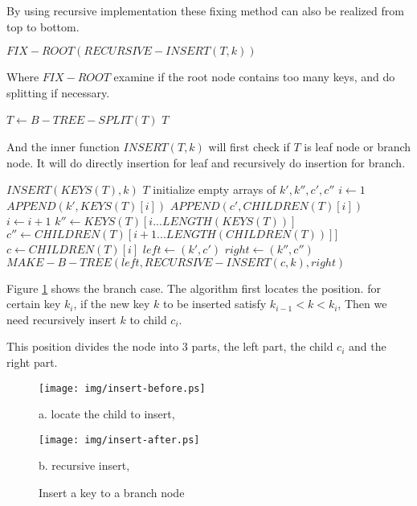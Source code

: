 \documentclass{article}
\begin{document}
By using recursive implementation these fixing method can also be
realized from top to bottom.

\begin{algorithmic}[1]
  \State \Return $FIX-ROOT(RECURSIVE-INSERT(T, k))$
\EndFunction
\end{algorithmic}

Where $FIX-ROOT$ examine if the root node contains too many keys,
and do splitting if necessary.

\begin{algorithmic}[1]
    \State $T \leftarrow B-TREE-SPLIT(T)$
  \EndIf
  \State \Return $T$
\EndFunction
\end{algorithmic}

And the inner function $INSERT(T, k)$ will first check if $T$
is leaf node or branch node. It will do directly insertion for leaf
and recursively do insertion for branch.

\begin{algorithmic}[1]
    \State $INSERT(KEYS(T), k)$
    \State \Return $T$
  \Else
    \State initialize empty arrays of $k', k'', c', c''$
    \State $i \leftarrow 1$
      \State $APPEND(k', KEYS(T)[i])$
      \State $APPEND(c', CHILDREN(T)[i])$
      \State $i \leftarrow i+1$
    \EndWhile
    \State $k'' \leftarrow KEYS(T)[i...LENGTH(KEYS(T))]$
    \State $c'' \leftarrow CHILDREN(T)[i+1...LENGTH(CHILDREN(T))]]$
    \State $c \leftarrow CHILDREN(T)[i]$
    \State $left \leftarrow (k', c')$
    \State $right \leftarrow (k'', c'')$
    \State \Return $MAKE-B-TREE(left, RECURSIVE-INSERT(c, k), right)$
  \EndIf
\EndFunction
\end{algorithmic}

Figure \ref{fig:recursive-insert} shows the branch case. The
algorithm first locates the position. for certain key $k_i$,
if the new key $k$ to be inserted satisfy $k_{i-1}<k<k_i$,
Then we need recursively insert $k$ to child $c_i$.

This position divides the node into 3 parts, the left part,
the child $c_i$ and the right part.

\begin{figure}[htbp]
       \begin{center}
       	  \texttt{[image: img/insert-before.ps]}

          a. locate the child to insert,

          \texttt{[image: img/insert-after.ps]}

          b. recursive insert,
        \caption{Insert a key to a branch node} \label{fig:recursive-insert}
       \end{center}
\end{figure}
\end{document}
